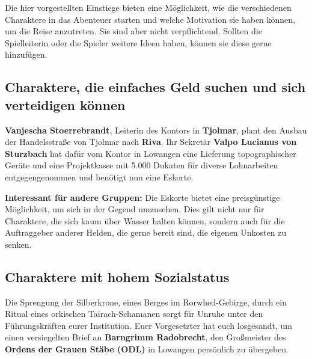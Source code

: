


Die hier vorgestellten Einstiege bieten eine Möglichkeit, wie die verschiedenen Charaktere in das Abenteuer starten und welche Motivation sie haben können, um die Reise anzutreten.
Sie sind aber nicht verpflichtend.
Sollten die Spielleiterin oder die Spieler weitere Ideen haben, können sie diese gerne hinzufügen.


\subsection*{Charaktere, die einfaches Geld suchen und sich verteidigen können}
\textbf{Vanjescha Stoerrebrandt}, Leiterin des Kontors in \textbf{Tjolmar}, plant den Ausbau der Handelsstraße von Tjolmar nach \textbf{Riva}.
Ihr Sekretär \textbf{Valpo Lucianus von Sturzbach} hat dafür vom Kontor in Lowangen eine Lieferung topographischer Geräte und eine Projektkasse mit 5.000 Dukaten für diverse Lohnarbeiten entgegengenommen und benötigt nun eine Eskorte.

\textbf{Interessant für andere Gruppen:} Die Eskorte bietet eine
preisgünstige Möglichkeit, um sich in der Gegend umzusehen.
Dies gilt nicht nur für Charaktere, die sich kaum über Wasser
halten können, sondern auch für die Auftraggeber anderer
Helden, die gerne bereit sind, die eigenen Unkosten zu senken.
\subsection*{Charaktere mit hohem Sozialstatus}
Die Sprengung der Silberkrone, eines Berges im Rorwhed-Gebirge, durch ein Ritual eines orkischen Tairach-Schamanen sorgt für Unruhe unter den Führungskräften eurer Institution.
Euer Vorgesetzter hat euch losgesandt, um einen versiegelten Brief an \textbf{Barngrimm Radobrecht}, den Großmeister des \textbf{Ordens der Grauen Stäbe (ODL)} in Lowangen persönlich zu übergeben.

